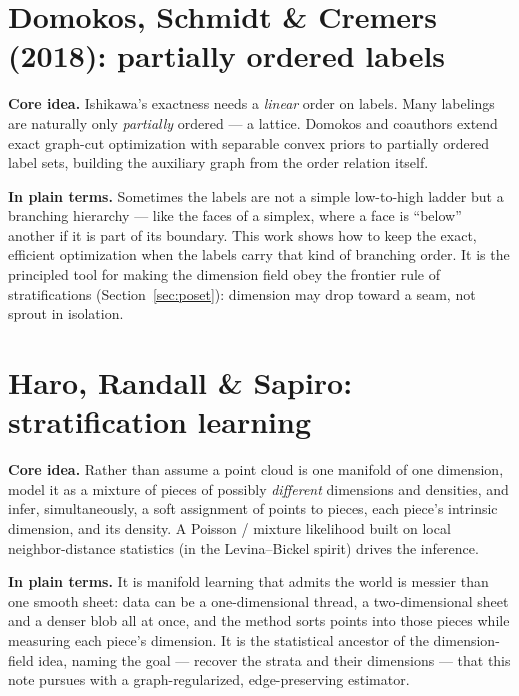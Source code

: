 \documentclass[11pt]{article}
\theoremstyle{definition}
\theoremstyle{remark}
\begin{document}
\section{Domokos, Schmidt \& Cremers (2018): partially ordered labels}
\label{app:domokos}
\textbf{Core idea.} Ishikawa's exactness needs a \emph{linear} order on labels.
Many labelings are naturally only \emph{partially} ordered --- a lattice. Domokos
and coauthors extend exact graph-cut optimization with separable convex priors to
partially ordered label sets, building the auxiliary graph from the order relation
itself.

\textbf{In plain terms.} Sometimes the labels are not a simple low-to-high ladder
but a branching hierarchy --- like the faces of a simplex, where a face is
``below'' another if it is part of its boundary. This work shows how to keep the
exact, efficient optimization when the labels carry that kind of branching order.
It is the principled tool for making the dimension field obey the frontier rule of
stratifications (Section~\ref{sec:poset}): dimension may drop toward a seam, not
sprout in isolation.

\section{Haro, Randall \& Sapiro: stratification learning}
\label{app:stratlearn}
\textbf{Core idea.} Rather than assume a point cloud is one manifold of one
dimension, model it as a mixture of pieces of possibly \emph{different}
dimensions and densities, and infer, simultaneously, a soft assignment of points
to pieces, each piece's intrinsic dimension, and its density. A Poisson / mixture
likelihood built on local neighbor-distance statistics (in the Levina--Bickel
spirit) drives the inference.

\textbf{In plain terms.} It is manifold learning that admits the world is messier
than one smooth sheet: data can be a one-dimensional thread, a two-dimensional
sheet and a denser blob all at once, and the method sorts points into those pieces
while measuring each piece's dimension. It is the statistical ancestor of the
dimension-field idea, naming the goal --- recover the strata and their dimensions
--- that this note pursues with a graph-regularized, edge-preserving estimator.
\end{document}
